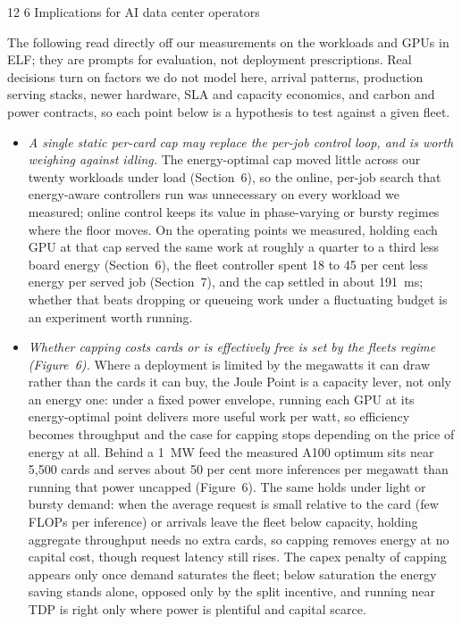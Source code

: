 \documentclass[3p,twocolumn]{elsarticle}
\makeatletter
\renewcommand\section{\@startsection{section}{1}{\z@}%
           {12\p@ \@plus 4\p@ \@minus 4\p@}%
           {6\p@ \@plus 4\p@ \@minus 3\p@}%
           {\normalsize\bfseries\boldmath}}
\makeatother
\begin{document}
\section{Implications for AI data center operators}\label{implications-for-ai-data-center-operators}

The following read directly off our measurements on the workloads and GPUs in ELF; they are prompts for
evaluation, not deployment prescriptions. Real decisions turn on factors we do not model here, arrival patterns,
production serving stacks, newer hardware, SLA and capacity economics, and carbon and power contracts, so each
point below is a hypothesis to test against a given fleet.

\begin{itemize}
\tightlist
\item
  \emph{A single static per-card cap may replace the per-job control loop, and is worth weighing against idling.} The energy-optimal cap moved little across our twenty workloads under load (Section~6), so the online, per-job search that energy-aware controllers run was unnecessary on every workload we measured; online control keeps its value in phase-varying or bursty regimes where the floor moves. On the operating points we measured, holding each GPU at that cap served the same work at roughly a quarter to a third less board energy (Section~6), the fleet controller spent 18 to 45 per cent less energy per served job (Section~7), and the cap settled in about 191~ms; whether that beats dropping or queueing work under a fluctuating budget is an experiment worth running.
\item
  \emph{Whether capping costs cards or is effectively free is set by the fleet\textquotesingle s regime (Figure~6).} Where a deployment is limited by the megawatts it can draw rather than the cards it can buy, the Joule Point is a capacity lever, not only an energy one: under a fixed power envelope, running each GPU at its energy-optimal point delivers more useful work per watt, so efficiency becomes throughput and the case for capping stops depending on the price of energy at all. Behind a 1~MW feed the measured A100 optimum sits near 5,500 cards and serves about 50 per cent more inferences per megawatt than running that power uncapped (Figure~6). The same holds under light or bursty demand: when the average request is small relative to the card (few FLOPs per inference) or arrivals leave the fleet below capacity, holding aggregate throughput needs no extra cards, so capping removes energy at no capital cost, though request latency still rises. The capex penalty of capping appears only once demand saturates the fleet; below saturation the energy saving stands alone, opposed only by the split incentive, and running near TDP is right only where power is plentiful and capital scarce.

\end{itemize}
\end{document}
